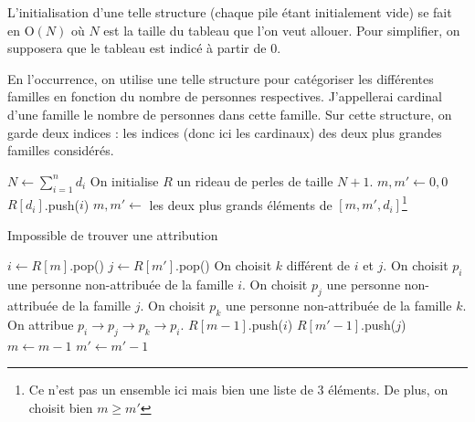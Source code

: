 \documentclass{../../notes}
\begin{document}
  L'initialisation d'une telle structure (chaque pile étant initialement vide) se fait en $\mathrm{O}(N)$ où $N$ est la taille du tableau que l'on veut allouer.
  Pour simplifier, on supposera que le tableau est indicé à partir de $0$.

  En l'occurrence, on utilise une telle structure pour catégoriser les différentes familles en fonction du nombre de personnes respectives. J'appellerai cardinal d'une famille le nombre de personnes dans cette famille.
  Sur cette structure, on garde deux indices : les indices (donc ici les cardinaux) des deux plus grandes familles considérés.

  \begin{algorithm}[H]
    \centering
    \begin{algorithmic}[1]
      \Statex {}
      \State $N \gets \sum_{i = 1}^n d_i$
      \State On initialise $R$ un rideau de perles de taille $N + 1$.
      \State $m, m' \gets 0, 0$
      \State $R[d_i]$.push($i$)
      \State $m, m' \gets$ les deux plus grands éléments de  $[m, m', d_i]$\footnote{Ce n'est pas un ensemble ici mais bien une liste de $3$ éléments. De plus, on choisit bien $m \ge m'$}
      \EndFor

      \vspace{0.5em}
      \Statex {}

      \State \Return Impossible de trouver une attribution \label{algo:2-3-line-check}
      \EndIf

      \vspace{0.5em}
      \Statex {}

      \State $i \gets R[m]$.pop()
      \State $j \gets R[m']$.pop()
      \State On choisit $k$ différent de $i$ et $j$. 
      \State On choisit $p_i$ une personne non-attribuée de la famille $i$.
      \State On choisit $p_j$ une personne non-attribuée de la famille $j$.
      \State On choisit $p_k$ une personne non-attribuée de la famille $k$.
      \State On attribue $p_i \to p_j \to p_k \to p_i$.
      \State $R[m - 1]$.push($i$)
      \State $R[m' - 1]$.push($j$) \label{algo:2-3-odd}
       $m \gets m - 1$ \EndIf
       $m' \gets m' - 1$ \EndIf
      \EndIf

      \vspace{0.5em}
      \Statex {}


\end{algorithmic}
\end{algorithm}
\end{document}
